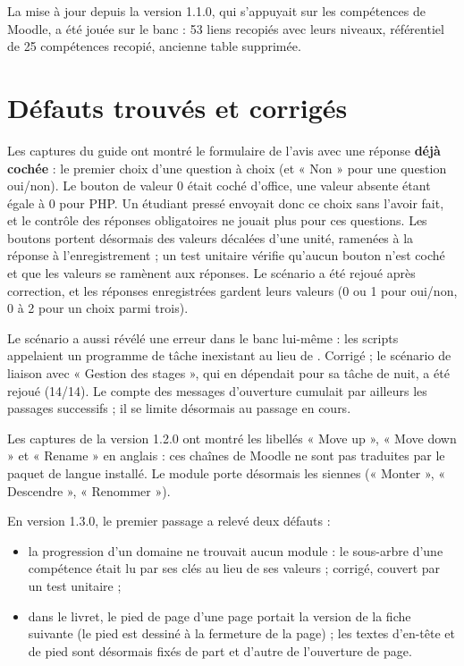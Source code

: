 \documentclass[11pt,a4paper]{article}
\newcommand{\code}[1]{\texttt{\detokenize{#1}}}
\begin{document}
La mise à jour depuis la version 1.1.0, qui s'appuyait sur les compétences de Moodle, a été
jouée sur le banc : 53 liens recopiés avec leurs niveaux, référentiel de 25 compétences recopié,
ancienne table supprimée.

\section{Défauts trouvés et corrigés}

Les captures du guide ont montré le formulaire de l'avis avec une réponse \textbf{déjà
cochée} : le premier choix d'une question à choix (et « Non » pour une question oui/non). Le
bouton de valeur 0 était coché d'office, une valeur absente étant égale à 0 pour PHP. Un
étudiant pressé envoyait donc ce choix sans l'avoir fait, et le contrôle des réponses
obligatoires ne jouait plus pour ces questions. Les boutons portent désormais des valeurs
décalées d'une unité, ramenées à la réponse à l'enregistrement ; un test unitaire vérifie
qu'aucun bouton n'est coché et que les valeurs se ramènent aux réponses. Le scénario a été
rejoué après correction, et les réponses enregistrées gardent leurs valeurs (0 ou 1
pour oui/non, 0 à 2 pour un choix parmi trois).

Le scénario a aussi révélé une erreur dans le banc lui-même : les scripts appelaient un
programme de tâche inexistant au lieu de \code{admin/cli/scheduled_task.php}. Corrigé ; le scénario de liaison avec « Gestion des
stages », qui en dépendait pour sa tâche de nuit, a été rejoué (14/14). Le compte des
messages d'ouverture cumulait par ailleurs les passages successifs ; il se limite désormais au
passage en cours.

Les captures de la version 1.2.0 ont montré les libellés « Move up », « Move down » et
« Rename » en anglais : ces chaînes de Moodle ne sont pas traduites par le paquet de langue
installé. Le module porte désormais les siennes (« Monter », « Descendre », « Renommer »).

En version 1.3.0, le premier passage a relevé deux défauts :
\begin{itemize}
  \item la progression d'un domaine ne trouvait aucun module : le sous-arbre d'une compétence
    était lu par ses clés au lieu de ses valeurs ; corrigé, couvert par un test unitaire ;
  \item dans le livret, le pied de page d'une page portait la version de la fiche suivante (le
    pied est dessiné à la fermeture de la page) ; les textes d'en-tête et de pied sont désormais
    fixés de part et d'autre de l'ouverture de page.
\end{itemize}
\end{document}
